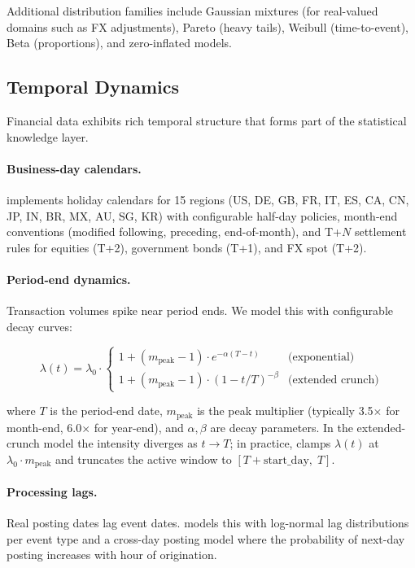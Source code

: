 Additional distribution families include Gaussian mixtures (for
real-valued domains such as FX adjustments), Pareto (heavy tails),
Weibull (time-to-event), Beta (proportions), and zero-inflated models.

\subsection{Temporal Dynamics}
\label{sec:stat_temporal}

Financial data exhibits rich temporal structure that forms part of the
statistical knowledge layer.

\paragraph{Business-day calendars.}
\system{} implements holiday calendars for 15 regions (US, DE, GB, FR,
IT, ES, CA, CN, JP, IN, BR, MX, AU, SG, KR) with configurable half-day
policies, month-end conventions (modified following, preceding,
end-of-month), and T+$N$ settlement rules for equities (T+2), government
bonds (T+1), and FX spot (T+2).

\paragraph{Period-end dynamics.}
Transaction volumes spike near period ends.  We model this with
configurable decay curves:

\begin{equation}
\lambda(t) = \lambda_0 \cdot
\begin{cases}
  1 + (m_{\text{peak}} - 1) \cdot e^{-\alpha(T-t)} & \text{(exponential)} \\
  1 + (m_{\text{peak}} - 1) \cdot (1 - t/T)^{-\beta} & \text{(extended crunch)}
\end{cases}
\label{eq:period_end}
\end{equation}

where $T$ is the period-end date, $m_{\text{peak}}$ is the peak
multiplier (typically 3.5$\times$ for month-end, 6.0$\times$ for
year-end), and $\alpha, \beta$ are decay parameters.
In the extended-crunch model the intensity diverges as $t \to T$;
in practice, \system{} clamps $\lambda(t)$ at $\lambda_0 \cdot
m_{\text{peak}}$ and truncates the active window to
$[T + \text{start\_day},\; T]$.

\paragraph{Processing lags.}
Real posting dates lag event dates.  \system{} models this with
log-normal lag distributions per event type and a cross-day posting
model where the probability of next-day posting increases with hour
of origination.


